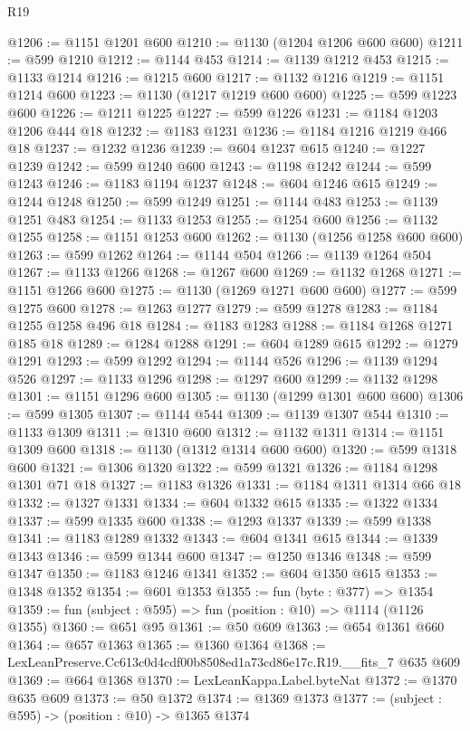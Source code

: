 \begin{lexlean}{R19}
\begin{coremodule}
@1206 := @1151 @1201 @600
@1210 := @1130 (@1204 @1206 @600 @600)
@1211 := @599 @1210
@1212 := @1144 @453
@1214 := @1139 @1212 @453
@1215 := @1133 @1214
@1216 := @1215 @600
@1217 := @1132 @1216
@1219 := @1151 @1214 @600
@1223 := @1130 (@1217 @1219 @600 @600)
@1225 := @599 @1223 @600
@1226 := @1211 @1225
@1227 := @599 @1226
@1231 := @1184 @1203 @1206 @444 @18
@1232 := @1183 @1231
@1236 := @1184 @1216 @1219 @466 @18
@1237 := @1232 @1236
@1239 := @604 @1237 @615
@1240 := @1227 @1239
@1242 := @599 @1240 @600
@1243 := @1198 @1242
@1244 := @599 @1243
@1246 := @1183 @1194 @1237
@1248 := @604 @1246 @615
@1249 := @1244 @1248
@1250 := @599 @1249
@1251 := @1144 @483
@1253 := @1139 @1251 @483
@1254 := @1133 @1253
@1255 := @1254 @600
@1256 := @1132 @1255
@1258 := @1151 @1253 @600
@1262 := @1130 (@1256 @1258 @600 @600)
@1263 := @599 @1262
@1264 := @1144 @504
@1266 := @1139 @1264 @504
@1267 := @1133 @1266
@1268 := @1267 @600
@1269 := @1132 @1268
@1271 := @1151 @1266 @600
@1275 := @1130 (@1269 @1271 @600 @600)
@1277 := @599 @1275 @600
@1278 := @1263 @1277
@1279 := @599 @1278
@1283 := @1184 @1255 @1258 @496 @18
@1284 := @1183 @1283
@1288 := @1184 @1268 @1271 @185 @18
@1289 := @1284 @1288
@1291 := @604 @1289 @615
@1292 := @1279 @1291
@1293 := @599 @1292
@1294 := @1144 @526
@1296 := @1139 @1294 @526
@1297 := @1133 @1296
@1298 := @1297 @600
@1299 := @1132 @1298
@1301 := @1151 @1296 @600
@1305 := @1130 (@1299 @1301 @600 @600)
@1306 := @599 @1305
@1307 := @1144 @544
@1309 := @1139 @1307 @544
@1310 := @1133 @1309
@1311 := @1310 @600
@1312 := @1132 @1311
@1314 := @1151 @1309 @600
@1318 := @1130 (@1312 @1314 @600 @600)
@1320 := @599 @1318 @600
@1321 := @1306 @1320
@1322 := @599 @1321
@1326 := @1184 @1298 @1301 @71 @18
@1327 := @1183 @1326
@1331 := @1184 @1311 @1314 @66 @18
@1332 := @1327 @1331
@1334 := @604 @1332 @615
@1335 := @1322 @1334
@1337 := @599 @1335 @600
@1338 := @1293 @1337
@1339 := @599 @1338
@1341 := @1183 @1289 @1332
@1343 := @604 @1341 @615
@1344 := @1339 @1343
@1346 := @599 @1344 @600
@1347 := @1250 @1346
@1348 := @599 @1347
@1350 := @1183 @1246 @1341
@1352 := @604 @1350 @615
@1353 := @1348 @1352
@1354 := @601 @1353
@1355 := fun (byte : @377) => @1354
@1359 := fun (subject : @595) => fun (position : @10) => @1114 (@1126 @1355)
@1360 := @651 @95
@1361 := @50 @609
@1363 := @654 @1361 @660
@1364 := @657 @1363
@1365 := @1360 @1364
@1368 := LexLeanPreserve.Cc613c0d4cdf00b8508ed1a73cd86e17c.R19.__fits_7 @635 @609
@1369 := @664 @1368
@1370 := LexLeanKappa.Label.byteNat
@1372 := @1370 @635 @609
@1373 := @50 @1372
@1374 := @1369 @1373
@1377 := (subject : @595) -> (position : @10) -> @1365 @1374

\end{coremodule}
\end{lexlean}
